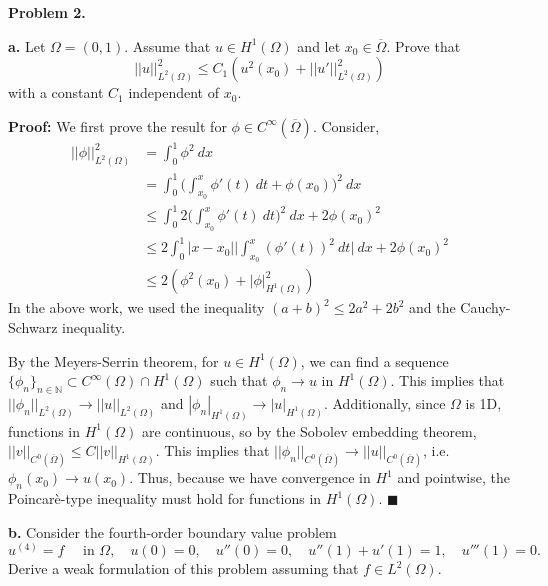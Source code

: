 \documentclass[11pt]{article}
\begin{document}
\vskip 2cm






{\bf Problem 2.}  
\vskip 1cm


\textbf{a.} Let $\Omega = (0,1)$. Assume that $u\in H^1(\Omega)$ and let $x_0 \in \overline{\Omega}$. Prove that 
\[ ||u||^2_{L^2(\Omega)} \leq C_1\left( u^2(x_0) + ||u'||^2_{L^2(\Omega)} \right) \]
with a constant $C_1$ independent of $x_0$. 


\vskip 1cm


\textbf{Proof:} We first prove the result for $\phi \in C^\infty(\overline{\Omega})$. 
Consider,
\begin{align*}
	||\phi||^2_{L^2(\Omega)} &= \int_0^1 \phi^2 \: dx \\ 
	&= \int_0^1 \Big( \int_{x_0}^x \phi'(t) \: dt + \phi(x_0) \Big)^2 \: dx \\
	&\leq \int_0^1 2 \Big( \int_{x_0}^x \phi'(t) \: dt \Big)^2 \: dx + 2 \phi(x_0)^2 \\
	&\leq 2 \int_0^1 |x - x_0| \Big|\int_{x_0}^x (\phi'(t))^2 \: dt \Big| \: dx + 2\phi(x_0)^2 \\ 
	&\leq 2(\phi^2(x_0) + |\phi|^2_{H^1(\Omega)})
\end{align*}
In the above work, we used the inequality $(a + b)^2 \leq 2a^2 + 2b^2$ and the Cauchy-Schwarz inequality. 

By the Meyers-Serrin theorem, for $u \in H^1(\Omega)$, we can find a sequence $\{ \phi_n \}_{n\in\mathbb{N}} \subset C^\infty(\Omega) \cap H^1(\Omega)$ such that $\phi_n \to u$ in $H^1(\Omega)$.
This implies that $||\phi_n||_{L^2(\Omega)} \to ||u||_{L^2(\Omega)}$ and $|\phi_n|_{H^1(\Omega)} \to |u|_{H^1(\Omega)}$.
Additionally, since $\Omega$ is 1D, functions in $H^1(\Omega)$ are continuous, so by the Sobolev embedding theorem, $||v||_{C^0(\overline{\Omega})} \leq C ||v||_{H^1(\Omega)}$.
This implies that $||\phi_n||_{C^0(\overline{\Omega})} \to ||u||_{C^0(\overline{\Omega})}$, i.e. $\phi_n(x_0) \to u(x_0)$. 
Thus, because we have convergence in $H^1$ and pointwise, the Poincar\`{e}-type inequality must hold for functions in $H^1(\Omega)$.
$\blacksquare$



\vskip 2cm



{\bf b.} Consider the fourth-order boundary value problem
\begin{equation}
    u^{(4)} = f \quad \text{ in } \Omega, \quad u(0) = 0, \quad u''(0) = 0, \quad  u''(1) + u'(1) = 1, \quad u'''(1) = 0.
\end{equation}
Derive a weak formulation of this problem assuming that $f \in L^2(\Omega)$.
\end{document}
